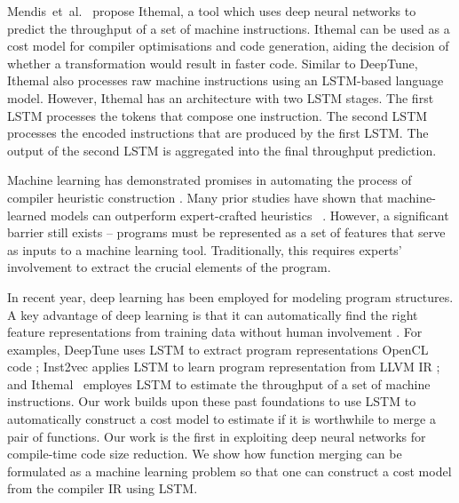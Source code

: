 Mendis~et~al.~\cite{mendis19} propose Ithemal, a tool which uses deep neural networks to predict the throughput of a set of machine instructions.
Ithemal can be used as a cost model for compiler optimisations and code generation, aiding the decision of whether a transformation would result in faster code.
Similar to DeepTune, Ithemal also processes raw machine instructions using an LSTM-based language model.
However, Ithemal has an architecture with two LSTM stages.
The first LSTM processes the tokens that compose one instruction.
The second LSTM processes the encoded instructions that are produced by the first LSTM.
The output of the second LSTM is aggregated into the final throughput prediction.










Machine learning has demonstrated promises in automating the process of compiler heuristic construction \cite{wang18}.
Many prior studies have shown that machine-learned models can outperform expert-crafted heuristics ~\cite{cavazos05,leather09, wang2014automatic,mendis19}.
However, a significant barrier still exists – programs must be represented as a set of features that serve as inputs to a machine learning tool.
Traditionally, this requires experts' involvement to extract the crucial elements of the program. 

In recent year, deep learning has been employed for modeling program structures.
A key advantage of deep learning is that it can automatically find the right feature representations from training data without human involvement \cite{allamanis2018survey}. For examples, DeepTune uses LSTM to extract program representations OpenCL code \cite{ cummins17}; Inst2vec applies LSTM to learn program representation from LLVM IR \cite{ben2018neural}; and Ithemal~\cite{mendis19} employes LSTM to estimate the throughput of a set of machine instructions. Our work builds upon these past foundations to use LSTM to automatically construct a cost model to estimate if it is worthwhile to merge a pair of functions. Our work is the first in exploiting deep neural networks for compile-time code size reduction. We show how function merging can be formulated as a machine learning problem so that one can construct a cost model from the compiler IR using LSTM. 

